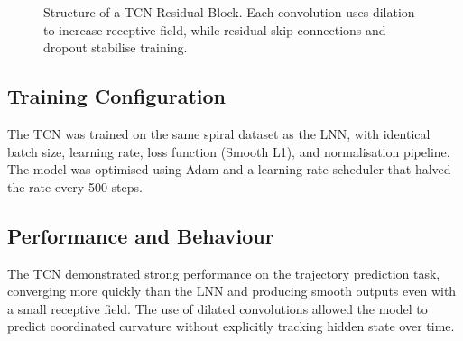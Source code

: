 \begin{figure}[H]
    \caption{Structure of a TCN Residual Block. Each convolution uses dilation to increase receptive field, while residual skip connections and dropout stabilise training.}
    \label{fig:tcn_residual_block}
\end{figure}

\subsection*{Training Configuration}
The TCN was trained on the same spiral dataset as the LNN, with identical batch size, learning rate, loss function (Smooth L1), and normalisation pipeline. The model was optimised using Adam and a learning rate scheduler that halved the rate every 500 steps.

\subsection*{Performance and Behaviour}
The TCN demonstrated strong performance on the trajectory prediction task, converging more quickly than the LNN and producing smooth outputs even with a small receptive field. The use of dilated convolutions allowed the model to predict coordinated curvature without explicitly tracking hidden state over time.

